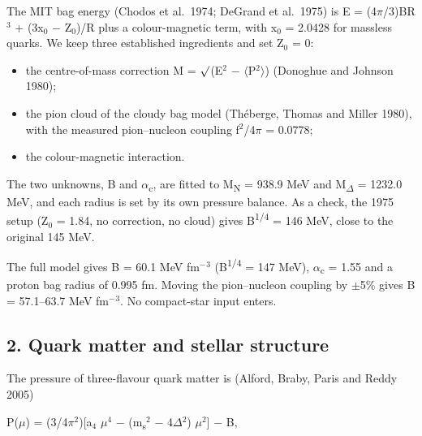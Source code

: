 \documentclass[
  11pt,
]{article}
\providecommand{\tightlist}{%
  \setlength{\itemsep}{0pt}\setlength{\parskip}{0pt}}
\begin{document}
The MIT bag energy (Chodos et al.~1974; DeGrand et al.~1975) is E = (4\ensuremath{\pi}/3)BR\ensuremath{^{3}} + (3x\ensuremath{_{0}} \ensuremath{-} Z\ensuremath{_{0}})/R plus a colour-magnetic term, with x\ensuremath{_{0}} = 2.0428 for massless quarks. We keep three established ingredients and set Z\ensuremath{_{0}} = 0:

\begin{itemize}
\tightlist
\item
  the centre-of-mass correction M = \ensuremath{\surd}(E\ensuremath{^{2}} \ensuremath{-} \ensuremath{\langle}P\ensuremath{^{2}}\ensuremath{\rangle}) (Donoghue and Johnson 1980);
\item
  the pion cloud of the cloudy bag model (Théberge, Thomas and Miller 1980), with the measured pion--nucleon coupling f\ensuremath{^{2}}/4\ensuremath{\pi} = 0.0778;
\item
  the colour-magnetic interaction.
\end{itemize}

The two unknowns, B and \ensuremath{\alpha}\textsubscript{c}, are fitted to M\textsubscript{N} = 938.9 MeV and M\textsubscript{\ensuremath{\Delta}} = 1232.0 MeV, and each radius is set by its own pressure balance. As a check, the 1975 setup (Z\ensuremath{_{0}} = 1.84, no correction, no cloud) gives B\textsuperscript{1/4} = 146 MeV, close to the original 145 MeV.

The full model gives B = 60.1 MeV fm\ensuremath{^{-}}\ensuremath{^{3}} (B\textsuperscript{1/4} = 147 MeV), \ensuremath{\alpha}\textsubscript{c} = 1.55 and a proton bag radius of 0.995 fm. Moving the pion--nucleon coupling by \ensuremath{\pm}5\% gives B = 57.1--63.7 MeV fm\ensuremath{^{-}}\ensuremath{^{3}}. No compact-star input enters.

\hypertarget{quark-matter-and-stellar-structure}{%
\subsection{2. Quark matter and stellar structure}\label{quark-matter-and-stellar-structure}}

The pressure of three-flavour quark matter is (Alford, Braby, Paris and Reddy 2005)

P(\ensuremath{\mu}) = (3/4\ensuremath{\pi}\ensuremath{^{2}}){[}a\ensuremath{_{4}} \ensuremath{\mu}\ensuremath{^{4}} \ensuremath{-} (m\textsubscript{s}\ensuremath{^{2}} \ensuremath{-} 4\ensuremath{\Delta}\ensuremath{^{2}}) \ensuremath{\mu}\ensuremath{^{2}}{]} \ensuremath{-} B,
\end{document}
